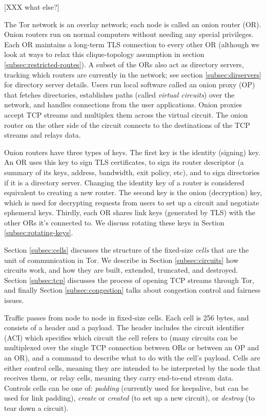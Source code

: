 \documentclass[times,10pt,twocolumn]{article}
\begin{document}
[XXX what else?]



\label{sec:design}

The Tor network is an overlay network; each node is called an onion router
(OR). Onion routers run on normal computers without needing any special
privileges. Each OR maintains a long-term TLS connection to every other
OR (although we look at ways to relax this clique-topology assumption in
section \ref{subsec:restricted-routes}). A subset of the ORs also act as
directory servers, tracking which routers are currently in the network;
see section \ref{subsec:dirservers} for directory server details. Users
run local software called an onion proxy (OP) that fetches directories,
establishes paths (called \emph{virtual circuits}) over the network,
and handles connections from the user applications. Onion proxies accept
TCP streams and multiplex them across the virtual circuit. The onion
router on the other side of the circuit connects to the destinations of
the TCP streams and relays data.

Onion routers have three types of keys. The first key is the identity
(signing) key. An OR uses this key to sign TLS certificates, to sign its
router descriptor (a summary of its keys, address, bandwidth, exit policy,
etc), and to sign directories if it is a directory server. Changing the
identity key of a router is considered equivalent to creating a new
router. The second key is the onion (decryption) key, which is used
for decrypting requests from users to set up a circuit and negotiate
ephemeral keys. Thirdly, each OR shares link keys (generated by TLS)
with the other ORs it's connected to. We discuss rotating these keys in
Section \ref{subsec:rotating-keys}.

Section \ref{subsec:cells} discusses the structure of the fixed-size
\emph{cells} that are the unit of communication in Tor. We describe
in Section \ref{subsec:circuits} how circuits work, and how they are
built, extended, truncated, and destroyed. Section \ref{subsec:tcp}
discusses the process of opening TCP streams through Tor, and finally
Section \ref{subsec:congestion} talks about congestion control and
fairness issues.

\label{subsec:cells}

Traffic passes from node to node in fixed-size cells. Each cell is 256
bytes, and consists of a header and a payload. The header includes the
circuit identifier (ACI) which specifies which circuit the cell refers to
(many circuits can be multiplexed over the single TCP connection between
ORs or between an OP and an OR), and a command to describe what to do
with the cell's payload. Cells are either control cells, meaning they are
intended to be interpreted by the node that receives them, or relay cells,
meaning they carry end-to-end stream data. Controls cells can be one of:
\emph{padding} (currently used for keepalive, but can be used for link
padding), \emph{create} or \emph{created} (to set up a new circuit),
or \emph{destroy} (to tear down a circuit).
\end{document}
